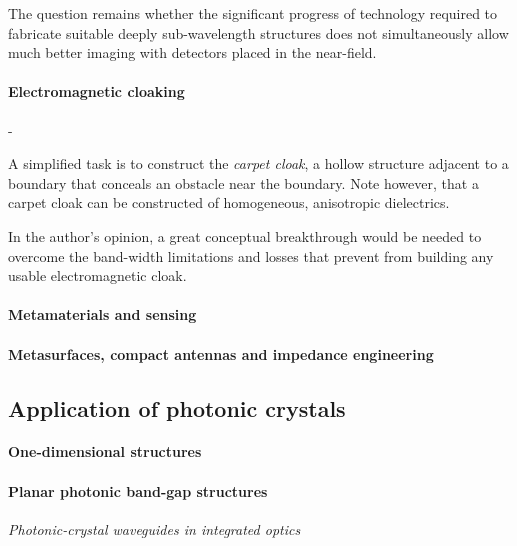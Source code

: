The question remains whether the significant progress of technology required to fabricate suitable deeply sub-wavelength structures does not simultaneously allow much better imaging with detectors placed in the near-field.
\paragraph{Electromagnetic cloaking}%

-


A simplified task is to construct the \textit{carpet cloak}, a hollow structure adjacent to a boundary that conceals an obstacle near the boundary. Note however, that a carpet cloak can be constructed of homogeneous, anisotropic dielectrics.

In the author's opinion, a great conceptual breakthrough would be needed to overcome the band-width limitations and losses that prevent from building any usable electromagnetic cloak. 

\paragraph{Metamaterials and sensing}%

\paragraph{Metasurfaces, compact antennas and impedance engineering}%


\subsection{Application of photonic crystals} 
\paragraph{One-dimensional structures}%

\paragraph{Planar photonic band-gap structures}%
\textit{Photonic-crystal waveguides in integrated optics}

